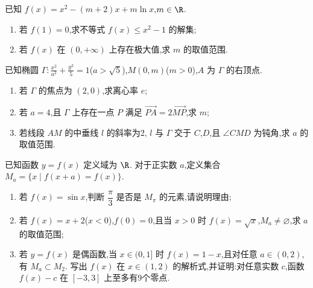 \begin{problem}
已知 \(f(x)=x^2-(m+2)x+m\ln x\),\(m\in\R\).
\begin{enumerate}
\item 若 \(f(1)=0\),求不等式 \(f(x)\le x^2-1\) 的解集;
\item 若 \(f(x)\) 在 \((0,+\infty)\) 上存在极大值,求 \(m\) 的取值范围.
\end{enumerate}
\end{problem}

\begin{problem}
已知椭圆 \(\Gamma:\frac{x^2}{a^2}+\frac{y^2}{5}=1\)(\(a>\sqrt5\)),\(M(0,m)\)(\(m>0\)),\(A\) 为 \(\Gamma\) 的右顶点.
\begin{enumerate}
\item 若 \(\Gamma\) 的焦点为 \((2,0)\),求离心率 \(e\);
\item 若 \(a=4\),且 \(\Gamma\) 上存在一点 \(P\) 满足 \(\overrightarrow{PA}=2\overrightarrow{MP}\),求 \(m\);
\item 若线段 \(AM\) 的中垂线 \(l\) 的斜率为2, \(l\) 与 \(\Gamma\) 交于 \(C\),\(D\),且 \(\angle CMD\) 为钝角,求 \(a\) 的取值范围.
\end{enumerate}
\end{problem}

\begin{problem}
已知函数 \(y=f(x)\) 定义域为 \(\R\). 对于正实数 \(a\),定义集合 \(M_a=\{x\mid f(x+a)=f(x)\}\).
\begin{enumerate}
\item 若 \(f(x)=\sin x\),判断 \(\dfrac{\pi}{3}\) 是否是 \(M_{\pi}\) 的元素,请说明理由;
\item 若 \(f(x)=x+2\)(\(x<0\)),\(f(0)=0\),且当 \(x>0\) 时 \(f(x)=\sqrt{x}\),\(M_a\neq\varnothing\),求 \(a\) 的取值范围;
\item 若 \(y=f(x)\) 是偶函数,当 \(x\in(0,1]\) 时 \(f(x)=1-x\),且对任意 \(a\in(0,2)\),有 \(M_a\subset M_2\). 写出 \(f(x)\) 在 \(x\in(1,2)\) 的解析式,并证明:对任意实数 \(c\),函数 \(f(x)-c\) 在 \([-3,3]\) 上至多有9个零点.
\end{enumerate}
\end{problem}

